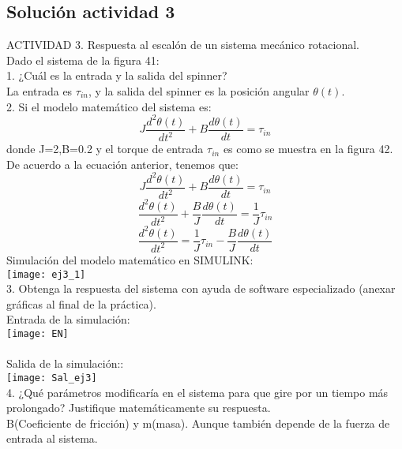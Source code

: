 \subsection{Solución actividad 3}

ACTIVIDAD 3. Respuesta al escalón de un sistema mecánico rotacional.\\
Dado el sistema de la figura 41:\\

1. ¿Cuál es la entrada y la salida del spinner?\\
La entrada es $\tau_{in}$, y la salida del spinner es la posición angular $\theta(t)$.\\ 


2. Si el modelo matemático del sistema es:\\
$$J\frac{d^2 \theta(t)}{dt^2} + B\frac{d\theta(t)}{dt} = \tau_{in}$$
donde J=2,B=0.2 y el torque de entrada $\tau_{in}$ es como se muestra en la figura 42.\\
De acuerdo a la ecuación anterior, tenemos que:
$$J\frac{d^2 \theta(t)}{dt^2} + B\frac{d\theta(t)}{dt} = \tau_{in}$$
$$\frac{d^2 \theta(t)}{dt^2} + \frac{B}{J}\frac{d\theta(t)}{dt} = \frac{1}{J}\tau_{in}$$
$$\frac{d^2 \theta(t)}{dt^2} = \frac{1}{J}\tau_{in} - \frac{B}{J}\frac{d\theta(t)}{dt}$$
Simulación del modelo matemático en SIMULINK:\\
\texttt{[image: ej3\_1]}\\



3. Obtenga la respuesta del sistema con ayuda de software especializado (anexar gráficas al final de la práctica).\\
Entrada de la simulación:\\
\texttt{[image: EN]} \\\\
Salida de la simulación::\\
\texttt{[image: Sal\_ej3]}\\


4. ¿Qué parámetros modificaría en el sistema para que gire por un tiempo más prolongado? Justifique matemáticamente su respuesta.\\
B(Coeficiente de fricción) y m(masa). Aunque también depende de la fuerza de entrada al sistema.